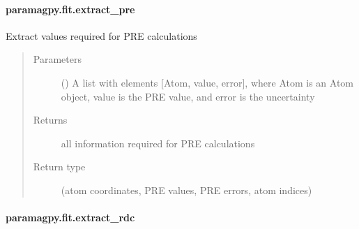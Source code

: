 \documentclass[a4paper,10pt,english,openany,oneside]{sphinxmanual}
\begin{document}
\paragraph{paramagpy.fit.extract\_pre}
\label{\detokenize{reference/generated/paramagpy.fit.extract_pre:paramagpy-fit-extract-pre}}\label{\detokenize{reference/generated/paramagpy.fit.extract_pre::doc}}

\begin{fulllineitems}
\label{\detokenize{reference/generated/paramagpy.fit.extract_pre:paramagpy.fit.extract_pre}}
Extract values required for PRE calculations
\begin{quote}\begin{description}
\item[{Parameters}] \leavevmode
{} () \textendash{} A list with elements {[}Atom, value, error{]}, where Atom is
an Atom object, value is the PRE value, and error is the uncertainty

\item[{Returns}] \leavevmode
{} \textendash{} all information required for PRE calculations

\item[{Return type}] \leavevmode
(atom coordinates, PRE values, PRE errors, atom indices)

\end{description}\end{quote}

\end{fulllineitems}



\paragraph{paramagpy.fit.extract\_rdc}
\label{\detokenize{reference/generated/paramagpy.fit.extract_rdc:paramagpy-fit-extract-rdc}}\label{\detokenize{reference/generated/paramagpy.fit.extract_rdc::doc}}
\end{document}
